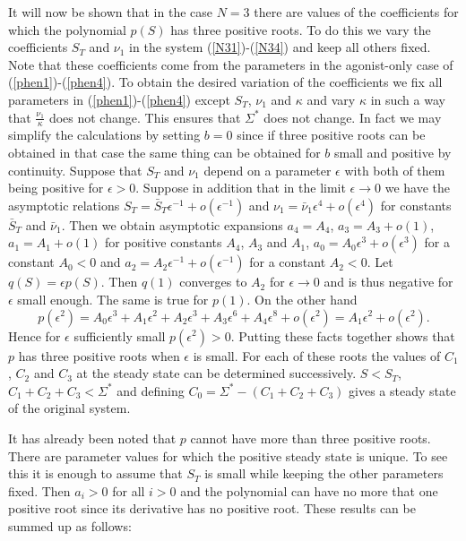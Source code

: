 \documentclass{article}
\begin{document}
It will now be shown that in the case $N=3$ there are values of the 
coefficients for which the polynomial $p(S)$ has three positive roots. To do 
this we vary the coefficients $S_T$ and $\nu_1$ in the system 
(\ref{N31})-(\ref{N34}) and keep all others fixed. Note that these coefficients
come from the parameters in the agonist-only case of 
(\ref{phen1})-(\ref{phen4}). To obtain the desired variation of the coefficients
we fix all parameters in (\ref{phen1})-(\ref{phen4}) except $S_T$, $\nu_1$ and 
$\kappa$ and vary $\kappa$ in such a way that $\frac{\nu_1}{\kappa}$ does not
change. This ensures that $\Sigma^*$ does not change. In fact we may simplify 
the calculations by setting $b=0$ since if three positive roots can be obtained
in that case the same thing can be obtained for $b$ small and positive by
continuity. Suppose that $S_T$ and $\nu_1$ depend on a parameter $\epsilon$
with both of them being positive for $\epsilon>0$. Suppose in addition that
in the limit $\epsilon\to 0$ we have the asymptotic relations 
$S_T=\bar S_T\epsilon^{-1}+o(\epsilon^{-1})$ and 
$\nu_1=\bar\nu_1\epsilon^4+o(\epsilon^4)$ for constants $\bar S_T$ and
$\bar\nu_1$. Then we obtain asymptotic expansions
$a_4=A_4$, $a_3=A_3+o(1)$, $a_1=A_1+o(1)$ for positive constants $A_4$, 
$A_3$ and $A_1$, $a_0=A_0\epsilon^3+o(\epsilon^3)$ for a constant $A_0<0$ and  
$a_2=A_2\epsilon^{-1}+o(\epsilon^{-1})$ for a constant $A_2<0$. Let 
$q(S)=\epsilon p(S)$. Then $q(1)$ converges to $A_2$ for $\epsilon\to 0$
and is thus negative for $\epsilon$ small enough. The same is true for
$p(1)$. On the other hand 
\begin{equation}
p(\epsilon^2)=A_0\epsilon^3+A_1\epsilon^2+A_2\epsilon^3
+A_3\epsilon^6+A_4\epsilon^8+o(\epsilon^2)=A_1\epsilon^2+o(\epsilon^2).
\end{equation}
Hence for $\epsilon$ sufficiently small $p(\epsilon^2)>0$. Putting these facts
together shows that $p$ has three positive roots when $\epsilon$ is small. For
each of these roots the values of $C_1$, $C_2$ and $C_3$ at the steady state 
can be determined successively. $S<S_T$, $C_1+C_2+C_3<\Sigma^*$ and defining 
$C_0=\Sigma^*-(C_1+C_2+C_3)$ gives a steady state of the original system.

It has already been noted that $p$ cannot have more than three positive roots. 
There are parameter values for which the positive steady
state is unique. To see this it is enough to assume that $S_T$ is small
while keeping the other parameters fixed. Then $a_i>0$ for all $i>0$ and the 
polynomial can have no more that one positive root since its derivative has
no positive root. These results can be summed up as follows:
\end{document}
